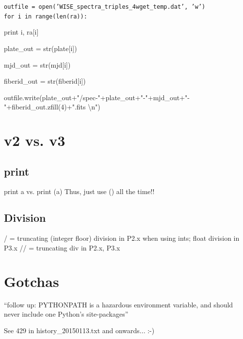 \documentclass[11pt,a4paper]{article}
\begin{document}
\noindent
{\tt  outfile = open('WISE\_spectra\_triples\_4wget\_temp.dat', 'w') \\
for i in range(len(ra)): 

    print i, ra[i] 

    plate\_out = str(plate[i])

    mjd\_out = str(mjd[i]) 

    fiberid\_out = str(fiberid[i])

    outfile.write(plate\_out+"/spec-"+plate\_out+"-"+mjd\_out+"-"+fiberid\_out.zfill(4)+".fits \textbackslash n")
}

\section{v2 vs. v3}
\subsection{print}
print a vs. print (a)
Thus, just use () all the time!!

\subsection{Division}
/ = truncating (integer floor) division in P2.x when using ints; float division in P3.x
// = truncating div in P2.x, P3.x 


\section{Gotchas}
``follow up: PYTHONPATH is a hazardous environment variable, and should never include one Python's site-packages'' 

See 429 in history\_20150113.txt and onwards... :-) 

\end{document}
